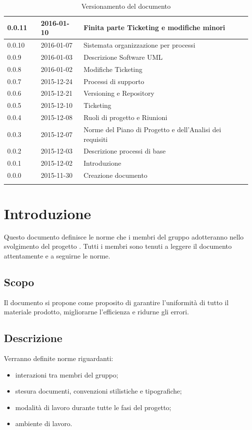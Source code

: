 \documentclass[12pt,a4paper]{article}
\begin{document}
\begin{center}
\begin{longtable}[H]{p{} p{} p{} p{}}
		0.0.11 & \NDC & 2016-01-10 & Finita parte Ticketing e modifiche minori \\*
		\midrule
		0.0.10 & \NDC & 2016-01-07 & Sistemata organizzazione per processi \\*
		\midrule
		0.0.9 & \AVE & 2016-01-03 & Descrizione Software UML \\*
		\midrule
		0.0.8 & \AVE & 2016-01-02 & Modifiche Ticketing \\*
		\midrule
		0.0.7 & \NDC & 2015-12-24 & Processi di supporto \\*
		\midrule
		0.0.6 & \AVI & 2015-12-21 & Versioning e Repository \\*
		\midrule
		0.0.5 & \AVE & 2015-12-10 & Ticketing \\*
		\midrule
		0.0.4 & \AVE & 2015-12-08 & Ruoli di progetto e Riunioni \\*
		\midrule
		0.0.3 & \AVI & 2015-12-07 & Norme del Piano di Progetto e dell'Analisi dei requisiti \\*
		\midrule
		0.0.2 & \AVI & 2015-12-03 & Descrizione processi di base \\*
		\midrule 
		0.0.1 & \NDC & 2015-12-02 & Introduzione \\*
		\midrule
		0.0.0 & \NDC & 2015-11-30 & Creazione documento \\*
		\bottomrule
		\caption{Versionamento del documento}
		\label{tabVers1}
	\end{longtable}
\end{center}

\newpage
\tableofcontents
\newpage
\listoftables
\listoffigures
\newpage

\section{Introduzione}
Questo documento definisce le norme che i membri del gruppo \nomeGruppo{} adotteranno nello svolgimento del progetto \prjL. Tutti i membri sono tenuti a leggere il documento attentamente e a seguirne le norme.

\subsection{Scopo}
Il documento si propone come proposito di garantire l'uniformità di tutto il materiale prodotto, migliorarne l'efficienza e ridurne gli errori.

\subsection{Descrizione}
Verranno definite norme riguardanti:
\begin{itemize}
	\item interazioni tra membri del gruppo;
	\item stesura documenti, convenzioni stilistiche e tipografiche;
	\item modalità di lavoro durante tutte le fasi del progetto;
	\item ambiente di lavoro.
\end{itemize}
\end{document}
